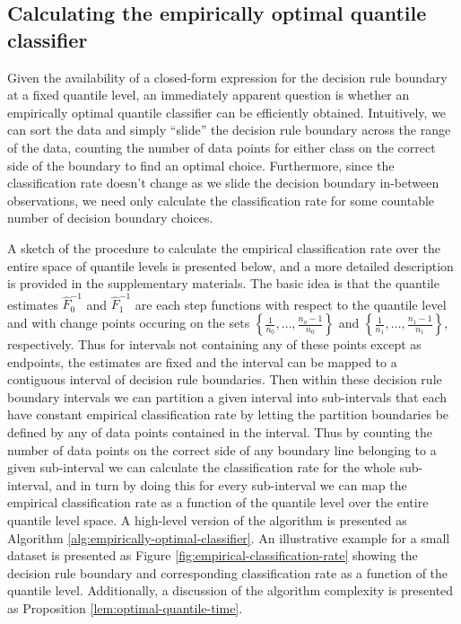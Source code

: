 \subsection{Calculating the empirically optimal quantile classifier}
\label{sec:empirically-optimal-algo}

Given the availability of a closed-form expression for the decision rule
boundary at a fixed quantile level, an immediately apparent question is whether
an empirically optimal quantile classifier can be efficiently obtained.
Intuitively, we can sort the data and simply ``slide'' the decision rule
boundary across the range of the data, counting the number of data points for
either class on the correct side of the boundary to find an optimal choice.
Furthermore, since the classification rate doesn't change as we slide the
decision boundary in-between observations, we need only calculate the
classification rate for some countable number of decision boundary choices.

A sketch of the procedure to calculate the empirical classification rate over
the entire space of quantile levels is presented below, and a more detailed
description is provided in the supplementary materials.  The basic idea is that
the quantile estimates $\hat{F}_0^{-1}$ and $\hat{F}_1^{-1}$ are each step
functions with respect to the quantile level and with change points occuring on
the sets $\left\{\frac{1}{n_0}, \dots, \frac{n_o - 1}{n_0}\right\}$ and
$\left\{\frac{1}{n_1}, \dots, \frac{n_1 - 1}{n_1}\right\}$, respectively.  Thus
for intervals not containing any of these points except as endpoints, the
estimates are fixed and the interval can be mapped to a contiguous interval of
decision rule boundaries.  Then within these decision rule boundary intervals we
can partition a given interval into sub-intervals that each have constant
empirical classification rate by letting the partition boundaries be defined by
any of data points contained in the interval.  Thus by counting the number of
data points on the correct side of any boundary line belonging to a given
sub-interval we can calculate the classification rate for the whole
sub-interval, and in turn by doing this for every sub-interval we can map the
empirical classification rate as a function of the quantile level over the
entire quantile level space.  A high-level version of the algorithm is presented
as Algorithm \ref{alg:empirically-optimal-classifier}.  An illustrative example
for a small dataset is presented as Figure
\ref{fig:empirical-classification-rate} showing the decision rule boundary and
corresponding classification rate as a function of the quantile level.
Additionally, a discussion of the algorithm complexity is presented as
Proposition \ref{lem:optimal-quantile-time}.

